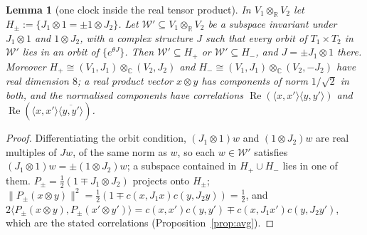 \documentclass[aps,pra,onecolumn,superscriptaddress,nofootinbib,10pt]{revtex4-2}
\newtheorem{lemma}[theorem]{Lemma}
\theoremstyle{definition}
\theoremstyle{remark}
\newcommand{\R}{\mathbb{R}}
\newcommand{\C}{\mathbb{C}}
\newcommand{\re}{\operatorname{Re}}
\newcommand{\ip}[2]{\langle #1,#2\rangle}
\begin{document}
\begin{lemma}[one clock inside the real tensor product]\label{lem:oneclock}
In $V_1\otimes_\R V_2$ let $H_\pm:=\{J_1\otimes1=\pm1\otimes J_2\}$.  Let $\mathcal W'\subseteq V_1\otimes_\R V_2$ be a subspace invariant under $J_1\otimes1$
and $1\otimes J_2$, with a complex structure $J$ such that every orbit of $T_1\times T_2$ in $\mathcal W'$ lies in an
orbit of $\{e^{\theta J}\}$.  Then $\mathcal W'\subseteq H_+$ or $\mathcal W'\subseteq H_-$, and $J=\pm J_1\otimes1$ there.  Moreover
$H_+\cong(V_1,J_1)\otimes_\C(V_2,J_2)$ and $H_-\cong(V_1,J_1)\otimes_\C(V_2,-J_2)$ have real dimension $8$; a real
product vector $x\otimes y$ has components of norm $1/\sqrt2$ in both, and the normalised components have
correlations $\re(\ip{x}{x'}\ip{y}{y'})$ and $\re(\ip{x}{x'}\overline{\ip{y}{y'}})$.
\end{lemma}
\begin{proof}
Differentiating the orbit condition, $(J_1\otimes1)w$ and $(1\otimes J_2)w$ are real multiples of $Jw$, of the same
norm as $w$, so each $w\in \mathcal W'$ satisfies $(J_1\otimes1)w=\pm(1\otimes J_2)w$; a subspace contained in $H_+\cup H_-$
lies in one of them.  $P_\pm=\frac12(1\mp J_1\otimes J_2)$ projects onto $H_\pm$; $\lVert P_\pm(x\otimes y)\rVert^2=
\frac12(1\mp c(x,J_1x)c(y,J_2y))=\frac12$, and $2\ip{P_\pm(x\otimes y)}{P_\pm(x'\otimes y')}=c(x,x')c(y,y')\mp
c(x,J_1x')c(y,J_2y')$, which are the stated correlations (Proposition~\ref{prop:avg}).
\end{proof}
\end{document}
